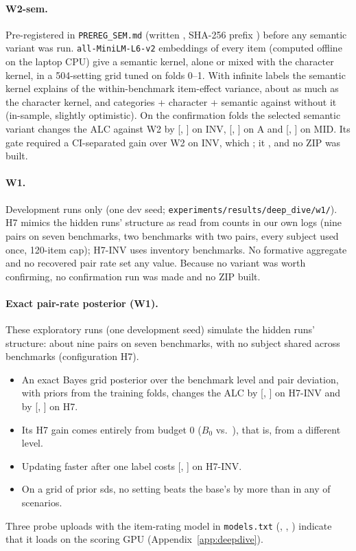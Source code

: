 \documentclass{article}
\begin{document}
\paragraph{W2-sem.} Pre-registered in \texttt{PREREG\_SEM.md} (written \WsTime, SHA-256 prefix \texttt{\WsSha}) before any semantic variant was run. \texttt{all-MiniLM-L6-v2} embeddings of every item (computed offline on the laptop CPU) give a semantic kernel, alone or mixed with the character kernel, in a 504-setting grid tuned on folds 0--1. With infinite labels the semantic kernel explains \WdRsqSem{} of the within-benchmark item-effect variance, about as much as the character kernel, and categories + character + semantic \WdRsqCatCharSem{} against \WdRsqCatChar{} without it (in-sample, slightly optimistic). On the confirmation folds the selected semantic variant changes the ALC against W2 by \WsInvVsWtwoMean{} [\WsInvVsWtwoLo, \WsInvVsWtwoHi] on INV, \WsAVsWtwoMean{} [\WsAVsWtwoLo, \WsAVsWtwoHi] on A and \WsMidVsWtwoMean{} [\WsMidVsWtwoLo, \WsMidVsWtwoHi] on MID. Its gate required a CI-separated gain over W2 on INV, which \WsGateD; it \WsGate, and no ZIP was built.

\paragraph{W1.} Development runs only (one dev seed; \texttt{experiments/results/deep\_dive/w1/}). H7 mimics the hidden runs' structure as read from counts in our own logs (nine pairs on seven benchmarks, two benchmarks with two pairs, every subject used once, 120-item cap); H7-INV uses inventory benchmarks. No formative aggregate and no recovered pair rate set any value. Because no variant was worth confirming, no confirmation run was made and no ZIP built.


\paragraph{Exact pair-rate posterior (W1).}
\label{app:w1}
These exploratory runs (one development seed) simulate the hidden runs' structure: about nine pairs on seven benchmarks, with no subject shared across benchmarks (configuration H7).
\begin{itemize}
\item An exact Bayes grid posterior over the benchmark level and pair deviation, with priors from the training folds, changes the ALC by \WoHsInvMean{} [\WoHsInvLo, \WoHsInvHi] on H7-INV and by \WoHsMean{} [\WoHsLo, \WoHsHi] on H7.
\item Its H7 gain comes entirely from budget 0 ($B_0$ \WoHsBZeroNpeb{} vs.\ \WoHsBZeroBase), that is, from a different level.
\item Updating faster after one label costs \WoFastMean{} [\WoFastLo, \WoFastHi] on H7-INV.
\item On a grid of prior sds, no setting beats the base's by more than \WoGridMaxGain{} in any of \WoGridN{} scenarios.
\end{itemize}
Three probe uploads with the item-rating model in \texttt{models.txt} (\ProbeAId, \ProbeBId, \ProbeCId) indicate that it loads on the scoring GPU (Appendix~\ref{app:deepdive}).
\end{document}
